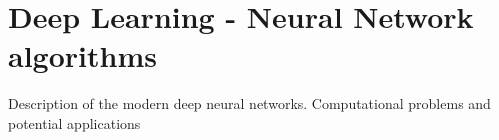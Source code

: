 \documentclass{standalone}
\begin{document}
\chapter[Deep Learning]{Deep Learning - Neural Network algorithms}\label{neural}

Description of the modern deep neural networks.
Computational problems and potential applications
\end{document}
